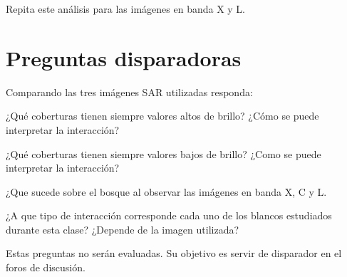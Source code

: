 Repita este análisis para las imágenes en banda X y L.

\section{Preguntas disparadoras}

Comparando las tres imágenes SAR utilizadas responda:

\begin{que}
    ¿Qué coberturas tienen siempre valores altos de brillo? ¿Cómo se puede interpretar la interacción?
\end{que}

\begin{que}
    ¿Qué coberturas tienen siempre valores bajos de brillo? ¿Como se puede interpretar la interacción?
\end{que}

\begin{que}
  ¿Que sucede sobre el bosque al observar las imágenes en banda X, C y L.
\end{que}

\begin{que}
  ¿A que tipo de interacción corresponde cada uno de los blancos estudiados durante esta clase? ¿Depende de la imagen utilizada?
\end{que}

Estas preguntas no serán evaluadas. Su objetivo es servir de disparador en el foros de discusión.
